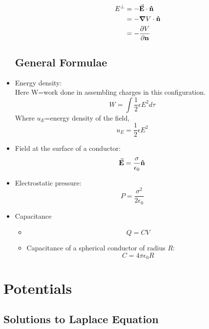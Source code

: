 \documentclass[12pt, oneside]{book}
\begin{document}
\begin{itemize}
\begin{tcolorbox}
\begin{itemize}
	     \begin{align}
	     	E^{\perp}&=-\va{E}\cdot\vu{n}\\
	     	         &=-\grad{V}\cdot \vu{n}\\
	     	         &=-\pdv{V}{\textbf{n}}
	     \end{align} 
	 
	\end{itemize}
	\end{tcolorbox}
\section{General Formulae}
\item Energy density: \\
Here W=work done in assembling charges in this configuration. 
\begin{equation}
	W=\int \frac{1}{2} \epsilon E^2 d\tau
\end{equation}
Where $u_E$=energy density of the field,
\begin{equation}
	u_E=\frac{1}{2}\epsilon E^2
\end{equation}

\item Field at the surface of a conductor: 
\begin{equation}
	\va{E}=\frac{\sigma}{\epsilon_0}\vu{n}
\end{equation}

\item Electrostatic pressure:\\

\begin{equation}
	P=\frac{\sigma^2}{2\epsilon_0}
\end{equation}
\item Capacitance
\begin{itemize}
	\item $$Q=CV$$
	
	\item Capacitance of a spherical conductor of radius $R$:
	$$C=4\pi \epsilon_0 R $$
\end{itemize}

\end{itemize}

\chapter{Potentials}

\section{Solutions to Laplace Equation}
\end{document}
